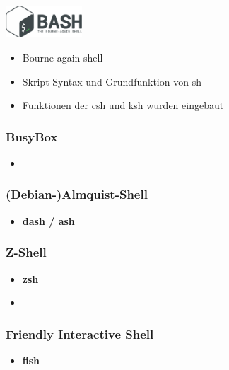 \begin{frame}
    \includegraphics[height=1.2cm]{res/bash.png}
    \begin{itemize}
        \item Bourne-again shell
        \item Skript-Syntax und Grundfunktion von sh
        \item Funktionen der csh und ksh wurden eingebaut
    \end{itemize}
\end{frame}

\begin{frame}
    \frametitle{BusyBox}
    \begin{itemize}
        \item
    \end{itemize}
\end{frame}

\begin{frame}
    \frametitle{(Debian-)Almquist-Shell}
    \begin{itemize}
        \item \textbf{dash / ash}
    \end{itemize}
\end{frame}

\begin{frame}
    \frametitle{Z-Shell}
    \begin{itemize}
        \item \textbf{zsh}
        \item
    \end{itemize}
\end{frame}

\begin{frame}
    \frametitle{Friendly Interactive Shell}
    \begin{itemize}
        \item \textbf{fish}
    \end{itemize}
\end{frame}
